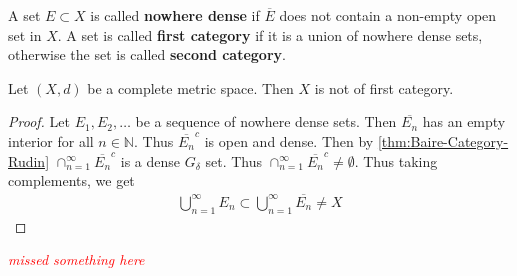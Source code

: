

\begin{definition}
  A set $E \subset X$ is called \textbf{nowhere dense} if $\overline{E}$ does
  not contain a non-empty open set in $X$. A set is called
  \textbf{first category} if it is a union of nowhere dense sets,
  otherwise the set is called \textbf{second category}.
\end{definition}

\begin{theorem}
  Let $(X, d)$ be a  complete metric space. Then $X$ is not of first category.
\end{theorem}
\begin{proof}
  Let $E_1 , E_2 , \ldots$ be a sequence of nowhere dense sets. Then
  $\overline{E_n}$ has an empty interior for all $n \in \mathbb{N}$.
  Thus $\overline{E_n}^c$ is open and dense. Then by
  \autoref{thm:Baire-Category-Rudin} $\cap_{n =
  1}^{\infty}\overline{E_n}^c$ is a dense $G_\delta$ set. Thus
  $\cap_{n = 1}^{\infty} \overline{E_n}^c \neq \emptyset$. Thus
  taking complements, we get
  \begin{align*}
    \bigcup_{n = 1}^{\infty}E_n \subset \bigcup_{n = 1}^{\infty}
    \overline{E_n} \neq X
  \end{align*}
\end{proof}

\textcolor{red}{ \scriptsize \it missed something here}
